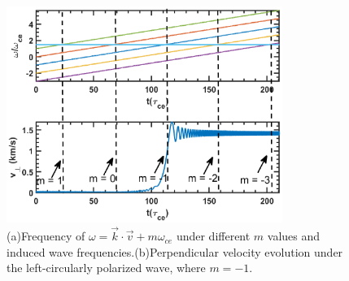 \documentclass{cpbtex3}
\begin{document}
\begin{figure}[htbp]
\centering
\includegraphics[width=0.8\textwidth]{Figure7.eps}%
\caption{\label{fig:7}(a)Frequency of $\omega = \vec{k} \cdot \vec{v} + m\omega_{ce}$ under different $m$ values and induced wave frequencies.(b)Perpendicular velocity evolution under the left-circularly polarized wave, where $m = -1$.}
\end{figure}
\end{document}
